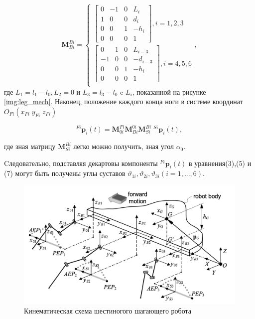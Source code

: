 \begin{equation}
	\mathbf{M}^{Bi}_{Bi} = 
	\begin{cases}
		\begin{bmatrix}
			0 	& -1	 & 0 & 	L_i	\\
			1 	& 0  & 0 & 	d_i	\\
			0 	& 0  & 1 & 	-h_i	\\
			0 	& 0  & 0 &	1
		\end{bmatrix}
		,i = 1,2,3 \\
				\begin{bmatrix}
			0 	& 1 	& 0 & 	L_{i-3}	\\
			-1 	& 0 & 0 & 	-d_{i-3}\\
			0 	& 0 & 1 & 	-h_i	\\
			0 	& 0 	& 0 &	1
		\end{bmatrix}
		,i = 4,5,6\\
	\end{cases}
	,
\end{equation}
где $L_1 = l_1 - l_0, L_2=0$ и $L_3=l_3-l_0$ c $L_i$, показанной на рисунке \ref{img:leg_mech}. Наконец, положение каждого конца ноги в системе координат $O_{Fi}(x_{Fi}\;y_{Fi}\;z_{Fi})$

\begin{equation}
^{F i} \mathbf{p}_{i}(t)=\mathbf{M}_{0 i}^{F i} \mathbf{M}_{B i}^{0 i} \mathbf{M}_{S i}^{B i} \;^{Si}\mathbf{p}_{i}(t),
\end{equation}

где зная матрицу $\mathbf{M}_{S i}^{B i}$ легко можно получить, зная угол $\alpha_0$.

Cледовательно, подставляя декартовы компоненты $^{Fi}\mathbf{p}_i(t)$ в уравнения(3),(5) и (7) могут быть получены углы суставов $\vartheta_{1i},\vartheta_{2i},\vartheta_{3i}(i=1,...,6)$.

\begin{figure}[h!]
	\centering
	\includegraphics[width = \linewidth]{img/kinematic_scheme}
	\caption{Кинематическая схема шестиногого шагающего робота}
	\label{img:hexapod_model}
\end{figure}

